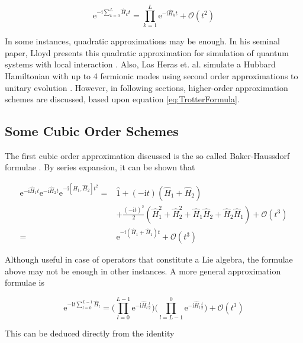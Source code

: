   \begin{equation}
    \mathrm{e}^{-\mathrm{i}\sum_{k = 0}^L \hat{H}_k t} = \prod_{k = 1}^{L} \mathrm{e}^{-\mathrm{i}\hat{H}_kt} + \mathcal{O}(t^2)
    \label{eq:2ndOrderTrotter}
  \end{equation}

  In some instances, quadratic approximations may be enough. In his seminal paper, Lloyd presents this quadratic approximation for simulation of quantum systems with local interaction \cite{LloydNature}. Also, Las Heras et. al. simulate a Hubbard Hamiltonian with up to 4 fermionic modes using second order approximations to unitary evolution \cite{HubbardSimul, HubbardSimulLasHeras}. However, in following sections, higher-order approximation schemes are discussed, based upon equation \ref{eq:TrotterFormula}.

  \subsection{Some Cubic Order Schemes}

  The first cubic order approximation discussed is the so called Baker-Haussdorf formulae \cite{Nielsen}. By series expansion, it can be shown that

  \begin{align*}
    \mathrm{e}^{-\mathrm{i}\hat{H}_1t}\mathrm{e}^{-\mathrm{i}\hat{H}_2t}\mathrm{e}^{-\mathrm{i}[\hat{H}_1,\hat{H}_2]t^2} = & \hat{1} + (-\mathrm{i}t) (\hat{H}_1 + \hat{H}_2) \\
    & + \frac{(-\mathrm{i}t)^2}{2}(\hat{H}_1^2 + \hat{H}_2^2 + \hat{H}_1\hat{H}_2 + \hat{H}_2\hat{H}_1) + \mathcal{O}(t^3) \\
    = & \mathrm{e}^{-\mathrm{i}(\hat{H}_1 + \hat{H}_1)t} + \mathcal{O}(t^3)
    \label{eq:Hausdorf1}
  \end{align*}

  Although useful in case of operators that constitute a Lie algebra, the formulae above may not be enough in other instances. A more general approximation formulae is

  \begin{equation}
    \mathrm{e}^{-\mathrm{i}t\sum_{l = 0}^{L-1}\hat{H}_l} = \Bigg(\prod_{l = 0}^{L-1}\mathrm{e}^{-\mathrm{i}\hat{H}_l\frac{t}{2}}\Bigg)\Bigg(\prod_{l = L-1}^{0}\mathrm{e}^{-\mathrm{i}\hat{H}_l\frac{t}{2}}\Bigg) + \mathcal{O}(t^3)
    \label{eq:Suzuki0}
  \end{equation}

  This can be deduced directly from the identity

